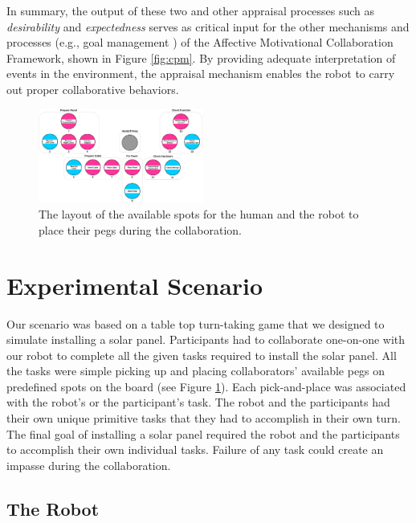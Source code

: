\documentclass{sig-alternate-05-2015}
\begin{document}
In summary, the output of these two and other appraisal processes such as
\textit{desirability} \cite{shayganfar:emotional-awareness} and
\textit{expectedness} \cite{shayganfar:appraisal-short} serves as critical input
for the other mechanisms and processes (e.g., goal management
\cite{shayganfar:goal-management}) of the Affective Motivational Collaboration
Framework, shown in Figure \ref{fig:cpm}. By providing adequate interpretation
of events in the environment, the appraisal mechanism enables the robot to carry
out proper collaborative behaviors.

\begin{figure}
  \centering
  \includegraphics[width=0.48\textwidth]{figure/gameBoard.pdf}
  \caption{The layout of the available spots for the human and the robot to
  place their pegs during the collaboration.}
  \label{fig:game_board}
\end{figure}

\section{Experimental Scenario}

Our scenario was based on a table top turn-taking game that we designed to
simulate installing a solar panel. Participants had to collaborate one-on-one
with our robot to complete all the given tasks required to install the solar
panel. All the tasks were simple picking up and placing collaborators' available
pegs on predefined spots on the board (see Figure \ref{fig:game_board}). Each
pick-and-place was associated with the robot's or the participant's task. The
robot and the participants had their own unique primitive tasks that they had to
accomplish in their own turn. The final goal of installing a solar panel
required the robot and the participants to accomplish their own individual
tasks. Failure of any task could create an impasse during the collaboration.

\subsection{The Robot}
\end{document}
